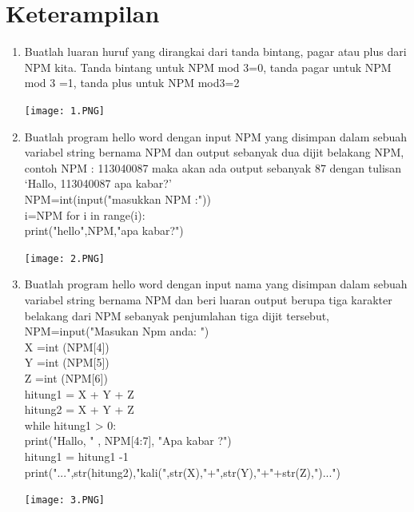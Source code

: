\documentclass{article}
\begin{document}
\section{Keterampilan}
\begin{enumerate}
    \item Buatlah luaran huruf yang dirangkai dari tanda bintang, pagar atau plus dari
    NPM kita. Tanda bintang untuk NPM mod 3=0, tanda pagar untuk NPM mod
    3 =1, tanda plus untuk NPM mod3=2
\begin{center}
    \texttt{[image: 1.PNG]}
\end{center}

    \item Buatlah program hello word dengan input NPM yang disimpan dalam sebuah
    variabel string bernama NPM dan output sebanyak dua dijit belakang NPM,
    contoh NPM : 113040087 maka akan ada output sebanyak 87 dengan tulisan ‘Hallo, 113040087 apa kabar?’ \\

    NPM=int(input("masukkan NPM :")) \\
    i=NPM%
    for i in range(i): \\
    print("hello",NPM,"apa kabar?")\\
\begin{center}
    \texttt{[image: 2.PNG]}
\end{center}

\item Buatlah program hello word dengan input nama yang disimpan dalam sebuah variabel string bernama NPM dan beri luaran output berupa tiga karakter belakang dari NPM sebanyak penjumlahan tiga dijit tersebut, \\
NPM=input("Masukan Npm anda: ")\\
X =int (NPM[4])\\
Y =int (NPM[5])\\
Z =int (NPM[6])\\
hitung1 = X + Y + Z\\
hitung2 = X + Y + Z\\
while hitung1 > 0:\\
        print("Hallo, " , NPM[4:7], "Apa kabar ?")\\
        hitung1 = hitung1 -1 \\
print("...",str(hitung2),"kali(",str(X),"+",str(Y),"+"+str(Z),")...")\\
\begin{center}
    \texttt{[image: 3.PNG]}
\end{center}


\end{enumerate}
\end{document}
